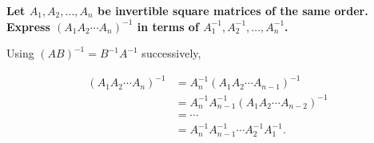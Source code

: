 \item \textbf{Let $A_1,A_2,\ldots,A_n$ be invertible
    square matrices of the same order. Express
    $(A_1A_2\cdots A_n)^{-1}$ in terms of
    $A_1^{-1},A_2^{-1},\ldots,A_n^{-1}$.} \\[0.5em]
        
    \begin{answer}
        Using $(AB)^{-1}=B^{-1}A^{-1}$ successively,

        $$
        \begin{aligned}
        (A_1A_2\cdots A_n)^{-1}
            &=A_n^{-1}(A_1A_2\cdots A_{n-1})^{-1}\\
            &=A_n^{-1}A_{n-1}^{-1}
            (A_1A_2\cdots A_{n-2})^{-1}\\
            &=\cdots\\
            &=\boxed{A_n^{-1}A_{n-1}^{-1}\cdots A_2^{-1}A_1^{-1}}.
        \end{aligned}
        $$
    \end{answer}

